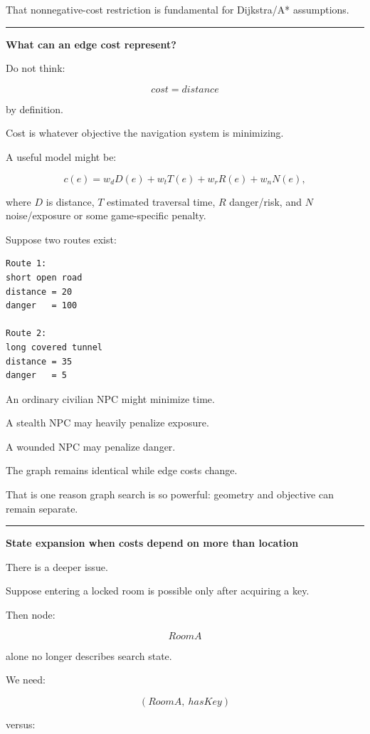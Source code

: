 That nonnegative-cost restriction is fundamental for Dijkstra/A* assumptions.

\begin{center}\rule{0.5\linewidth}{0.5pt}\end{center}

\textbf{What can an edge cost represent?}

Do not think:

\[
cost = distance
\]

by definition.

Cost is whatever objective the navigation system is minimizing.

A useful model might be:

\[
c(e)
=
w_dD(e)
+
w_tT(e)
+
w_rR(e)
+
w_nN(e),
\]

where \(D\) is distance, \(T\) estimated traversal time, \(R\) danger/risk, and \(N\) noise/exposure or some game-specific penalty.

Suppose two routes exist:

\begin{verbatim}
Route 1:
short open road
distance = 20
danger   = 100

Route 2:
long covered tunnel
distance = 35
danger   = 5
\end{verbatim}

An ordinary civilian NPC might minimize time.

A stealth NPC may heavily penalize exposure.

A wounded NPC may penalize danger.

The graph remains identical while edge costs change.

That is one reason graph search is so powerful: geometry and objective can remain separate.

\begin{center}\rule{0.5\linewidth}{0.5pt}\end{center}

\textbf{State expansion when costs depend on more than location}

There is a deeper issue.

Suppose entering a locked room is possible only after acquiring a key.

Then node:

\[
RoomA
\]

alone no longer describes search state.

We need:

\[
(RoomA,\ hasKey)
\]

versus:

